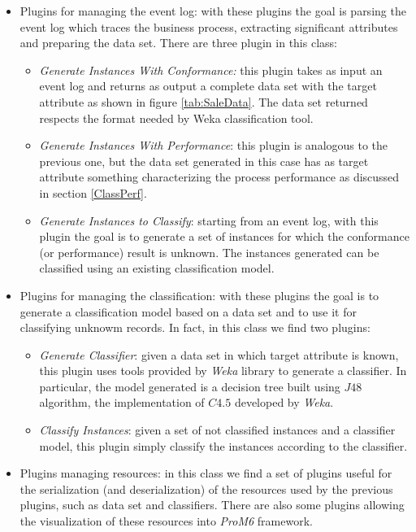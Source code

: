 \documentclass{llncs}
\begin{document}
\begin{itemize}
\item Plugins for managing the event log: with these plugins the goal is parsing the event log which traces the business process, extracting significant attributes and preparing the data set. There are three plugin in this class:\\
\begin{itemize}
\item \emph{Generate Instances With Conformance:} this plugin takes as input an event log and returns as output a complete data set with the target attribute as shown in figure \ref{tab:SaleData}. The data set returned respects the format needed by Weka classification tool.
\item \emph{Generate Instances With Performance}: this plugin is analogous to the previous one, but the data set generated in this case has as target attribute something characterizing the process performance as discussed in section \ref{ClassPerf}.
\item \emph{Generate Instances to Classify}: starting from an event log, with this plugin the goal is to generate a set of instances for which the conformance (or performance) result is unknown. The instances generated can be classified using an existing classification model.\\
\end{itemize}
\item Plugins for managing the classification: with these plugins the goal is to generate a classification model based on a data set and to use it for classifying unknowm records. In fact, in this class we find two plugins:\\
\begin{itemize}
\item \emph{Generate Classifier}: given a data set in which target attribute is known, this plugin uses tools provided by \emph{Weka} library to generate a classifier. In particular, the model generated is a decision tree built using $J48$ algorithm, the implementation of $C4.5$ developed by \emph{Weka}.
\item \emph{Classify Instances}: given a set of not classified instances and a classifier model, this plugin simply classify the instances according to the classifier. \\
\end{itemize}
\item Plugins managing resources: in this class we find a set of plugins useful for the serialization (and deserialization) of the resources used by the previous plugins, such as data set and classifiers. There are also some plugins allowing the visualization of these resources into \emph{ProM6} framework.
\end{itemize}
\end{document}
